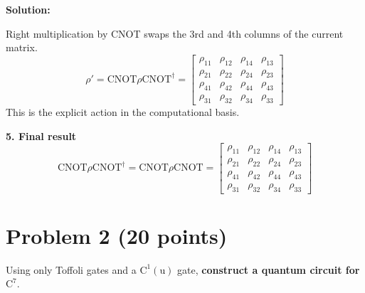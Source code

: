 \documentclass[11pt]{article}
\newenvironment{solution}
{\par\noindent\textbf{Solution:}\par}
{\vspace{1em}}
\begin{document}
\begin{solution}
Right multiplication by CNOT swaps the 3rd and 4th columns of the current matrix. \[\rho' = \mathrm{CNOT}\rho\mathrm{CNOT}^\dagger = \begin{bmatrix}\rho_{11} & \rho_{12} & \rho_{14} & \rho_{13} \\ \rho_{21} & \rho_{22} & \rho_{24} & \rho_{23} \\ \rho_{41} & \rho_{42} & \rho_{44} & \rho_{43} \\ \rho_{31} & \rho_{32} & \rho_{34} & \rho_{33}\end{bmatrix}\]
This is the explicit action in the computational basis.

\textbf{5. Final result}
\[\boxed{\mathrm{CNOT}\rho\mathrm{CNOT}^\dagger = \mathrm{CNOT}\rho\mathrm{CNOT} = \begin{bmatrix}\rho_{11} & \rho_{12} & \rho_{14} & \rho_{13} \\ \rho_{21} & \rho_{22} & \rho_{24} & \rho_{23} \\ \rho_{41} & \rho_{42} & \rho_{44} & \rho_{43} \\ \rho_{31} & \rho_{32} & \rho_{34} & \rho_{33}\end{bmatrix}}\]
\end{solution}

\section*{Problem 2 (20 points)}
Using only Toffoli gates and a \(\mathrm{C^1(u)}\) gate, \textbf{construct a quantum circuit for \(\mathrm{C^7}\)}.
\end{document}
